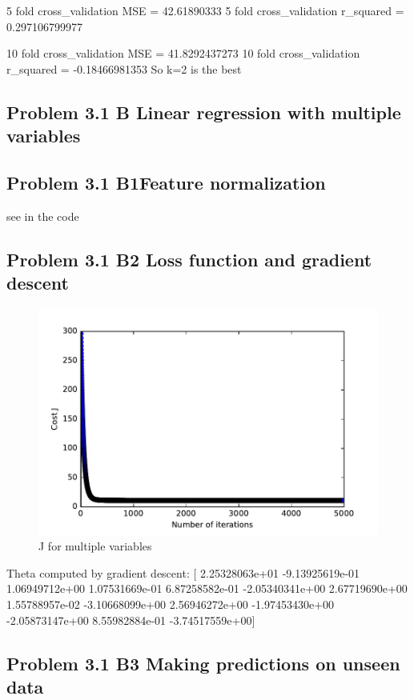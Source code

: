 \documentclass[pdftex,11pt]{article}
\begin{document}
5  fold cross\_validation MSE =  42.61890333
5  fold cross\_validation r\_squared =  0.297106799977

10  fold cross\_validation MSE =  41.8292437273
10  fold cross\_validation r\_squared =  -0.18466981353
So k=2 is the best








\subsection{Problem 3.1 B Linear regression with multiple variables}
\subsection{Problem 3.1 B1Feature normalization}
see in the code
\subsection{Problem 3.1 B2 Loss function and gradient descent}
\begin{figure}
  \caption{J for multiple variables}
  \centering
    \includegraphics[scale=1]{fig5.pdf}
\end{figure}
Theta computed by gradient descent:  [  2.25328063e+01  -9.13925619e-01   1.06949712e+00   1.07531669e-01
   6.87258582e-01  -2.05340341e+00   2.67719690e+00   1.55788957e-02
  -3.10668099e+00   2.56946272e+00  -1.97453430e+00  -2.05873147e+00
   8.55982884e-01  -3.74517559e+00]

\subsection{Problem 3.1 B3 Making predictions on unseen data}
\end{document}
